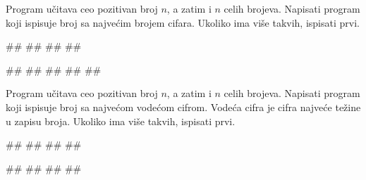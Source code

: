 \begin{Exercise}[label=1.3_23] 
Program učitava ceo pozitivan broj $n$, a zatim i $n$ celih
brojeva. Napisati program koji ispisuje broj sa najvećim brojem
cifara. Ukoliko ima više takvih, ispisati prvi.

\begin{miditest}
\begin{upotreba}{1}
#\naslovInt#
##
##
##
\end{upotreba}
\end{miditest}
\begin{miditest}
\begin{upotreba}{2}
#\naslovInt#
##
##
##
##
\end{upotreba}
\end{miditest}
\end{Exercise}
\begin{Answer}[ref=1.3_23]
\end{Answer}

\begin{Exercise}[label=1.3_24] 
Program učitava ceo pozitivan broj $n$, a zatim i $n$ celih
brojeva. Napisati program koji ispisuje broj sa najvećom vodećom
cifrom. Vodeća cifra je cifra najveće težine u zapisu broja. Ukoliko
ima više takvih, ispisati prvi.

\begin{miditest}
\begin{upotreba}{1}
#\naslovInt#
##
##
##
\end{upotreba}
\end{miditest}
\begin{miditest}
\begin{upotreba}{1}
#\naslovInt#
##
##
##
\end{upotreba}
\end{miditest}
\end{Exercise}
\begin{Answer}[ref=1.3_24]
\end{Answer}


